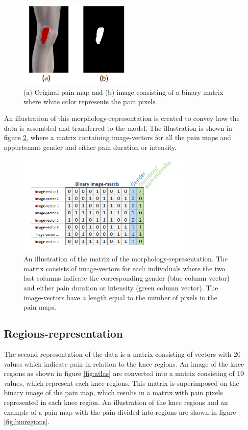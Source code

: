 \begin{figure} [H]
\centering
\includegraphics[width=0.5\textwidth]{figures/cropbin7}
\caption{(a) Original pain map and (b) image consisting of a binary matrix where white color represents the pain pixels.}
\label{fig:cropbin7}
\end{figure}

\noindent
An illustration of this morphology-representation is created to convey how the data is assembled and transferred to the model. The illustration is shown in figure \ref{fig:binmatrix}, where a matrix containing image-vectors for all the pain maps and appurtenant gender and either pain duration or intensity.

\begin{figure} [H]
\centering
\includegraphics[width=0.8\textwidth]{figures/binaryimagematrix}
\caption{An illustration of the matrix of the morphology-representation. The matrix consists of image-vectors for each individuals where the two last columns indicate the corresponding gender (blue column vector) and either pain duration or intensity (green column vector). The image-vectors have a length equal to the number of pixels in the pain maps.}
\label{fig:binmatrix}
\end{figure}


\subsection{Regions-representation} \label{sec:Regions}
The second representation of the data is a matrix consisting of vectors with 20 values which indicate pain in relation to the knee regions.
An image of the knee regions as shown in figure \ref{fig:atlas} are converted into a matrix consisting of 10 values, which represent each knee regions. This matrix is superimposed on the binary image of the pain map, which results in a matrix with pain pixels represented in each knee region. 
An illustration of the knee regions and an example of a pain map with the pain divided into regions are shown in figure \ref{fig:binregions}.

